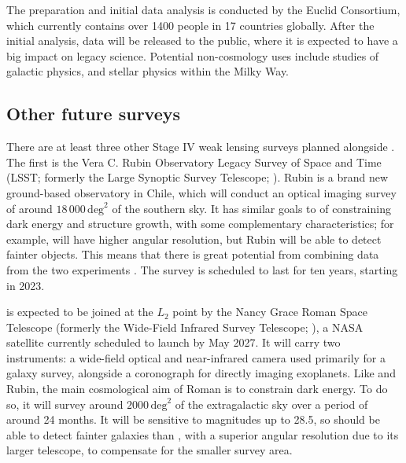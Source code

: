 The preparation and initial data analysis is conducted by the Euclid Consortium, which currently contains over 1400 people in 17 countries globally. After the initial analysis, data will be released to the public, where it is expected to have a big impact on legacy science. Potential non-cosmology uses include studies of galactic physics, and stellar physics within the Milky Way.

\subsection{Other future surveys}
\label{co_Sec:future_wl_surveys}

There are at least three other Stage IV weak lensing surveys planned alongside \Euclid{}. The first is the Vera C. Rubin Observatory Legacy Survey of Space and Time (LSST; formerly the Large Synoptic Survey Telescope; \citealt{Ivezic2019}). Rubin is a brand new ground-based observatory in Chile, which will conduct an optical imaging survey of around $18\,000\,\text{deg}^2$ of the southern sky. It has similar goals to \Euclid{} of constraining dark energy and structure growth, with some complementary characteristics; for example, \Euclid{} will have higher angular resolution, but Rubin will be able to detect fainter objects. This means that there is great potential from combining data from the two experiments \citep{Rhodes2017, Guy2022}. The survey is scheduled to last for ten years, starting in 2023.

\Euclid{} is expected to be joined at the $L_2$ point by the Nancy Grace Roman Space Telescope (formerly the Wide-Field Infrared Survey Telescope; \citealt{Spergel2015}), a NASA satellite currently scheduled to launch by May 2027. It will carry two instruments: a wide-field optical and near-infrared camera used primarily for a galaxy survey, alongside a coronograph for directly imaging exoplanets. Like \Euclid{} and Rubin, the main cosmological aim of Roman is to constrain dark energy. To do so, it will survey around $2000\,\text{deg}^2$ of the extragalactic sky over a period of around 24 months. It will be sensitive to magnitudes up to 28.5, so should be able to detect fainter galaxies than \Euclid{}, with a superior angular resolution due to its larger telescope, to compensate for the smaller survey area.

